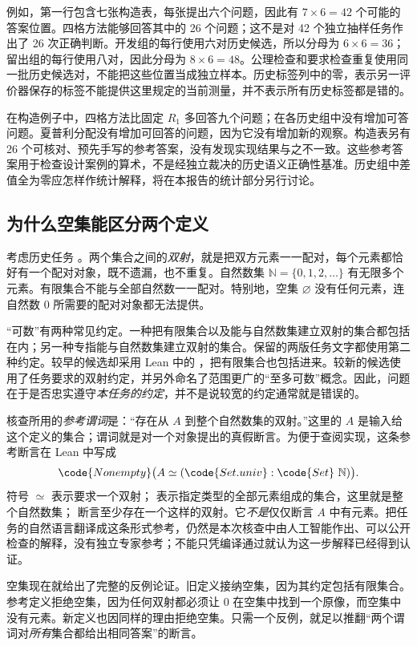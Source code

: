 例如，第一行包含七张构造表，每张提出六个问题，因此有 $7\times6=42$ 个可能的答案位置。四格方法能够回答其中的 26 个问题；这不是对 42 个独立抽样任务作出了 26 次正确判断。开发组的每行使用六对历史候选，所以分母为 $6\times6=36$；留出组的每行使用八对，因此分母为 $8\times6=48$。公理检查和要求检查重复使用同一批历史候选对，不能把这些位置当成独立样本。历史标签列中的零，表示另一评价器保存的标签不能提供这里规定的当前测量，并不表示所有历史标签都是错的。

在构造例子中，四格方法比固定 $R_1$ 多回答九个问题；在各历史组中没有增加可答问题。夏普利分配没有增加可回答的问题，因为它没有增加新的观察。构造表另有 26 个可核对、预先手写的参考答案，没有发现实现结果与之不一致。这些参考答案用于检查设计案例的算术，不是经独立裁决的历史语义正确性基准。历史组中差值全为零应怎样作统计解释，将在本报告的统计部分另行讨论。

\subsection{为什么空集能区分两个定义}
\label{subsec:definition-witness}
考虑历史任务 。两个集合之间的\emph{双射}，就是把双方元素一一配对，每个元素都恰好有一个配对对象，既不遗漏，也不重复。自然数集 $\mathbb N=\{0,1,2,\ldots\}$ 有无限多个元素。有限集合不能与全部自然数一一配对。特别地，空集 $\varnothing$ 没有任何元素，连自然数 $0$ 所需要的配对对象都无法提供。

“可数”有两种常见约定。一种把有限集合以及能与自然数集建立双射的集合都包括在内；另一种专指能与自然数集建立双射的集合。保留的两版任务文字都使用第二种约定。较早的候选却采用 Lean 中的 ，把有限集合也包括进来。较新的候选使用了任务要求的双射约定，并另外命名了范围更广的“至多可数”概念。因此，问题在于是否忠实遵守\emph{本任务的约定}，并不是说较宽的约定通常就是错误的。

核查所用的\emph{参考谓词}是：“存在从 $A$ 到整个自然数集的双射。”这里的 $A$ 是输入给这个定义的集合；谓词就是对一个对象提出的真假断言。为便于查阅实现，这条参考断言在 Lean 中写成
\[
\code{Nonempty}\bigl(A\simeq(\code{Set.univ}:\code{Set}\ \mathbb N)\bigr).
\]
符号 $\simeq$ 表示要求一个双射； 表示指定类型的全部元素组成的集合，这里就是整个自然数集； 断言至少存在一个这样的双射。它\emph{不是}仅仅断言 $A$ 中有元素。把任务的自然语言翻译成这条形式参考，仍然是本次核查中由人工智能作出、可以公开检查的解释，没有独立专家参考；不能只凭编译通过就认为这一步解释已经得到认证。

空集现在就给出了完整的反例论证。旧定义接纳空集，因为其约定包括有限集合。参考定义拒绝空集，因为任何双射都必须让 $0$ 在空集中找到一个原像，而空集中没有元素。新定义也因同样的理由拒绝空集。只需一个反例，就足以推翻“两个谓词对\emph{所有}集合都给出相同答案”的断言。

